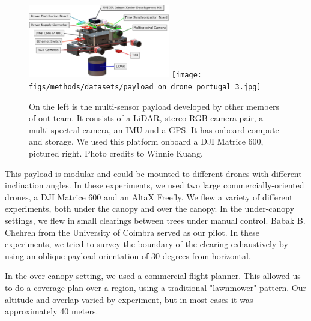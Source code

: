 \begin{figure}
    \centering
    \includegraphics[width=0.55\textwidth]{figs/methods/datasets/payload_annotated.pdf}
    \hfill
    \texttt{[image: figs/methods/datasets/payload\_on\_drone\_portugal\_3.jpg]}
    \caption{On the left is the multi-sensor payload developed by other members of out team. It consists of a LiDAR, stereo RGB camera pair, a multi spectral camera, an IMU and a GPS. It has onboard compute and storage. We used this platform onboard a DJI Matrice 600, pictured right. Photo credits to Winnie Kuang.}
    \label{fig:methods:payload}
\end{figure}

This payload is modular and could be mounted to different drones with different inclination angles. In these experiments, we used two large commercially-oriented drones, a DJI Matrice 600 and an AltaX Freefly. We flew a variety of different experiments, both under the canopy and over the canopy. In the under-canopy settings, we flew in small clearings between trees under manual control. Babak B. Chehreh from the University of Coimbra served as our pilot. In these experiments, we tried to survey the boundary of the clearing exhaustively by using an oblique payload orientation of 30 degrees from horizontal.

In the over canopy setting, we used a commercial flight planner. This allowed us to do a coverage plan over a region, using a traditional "lawnmower" pattern. Our altitude and overlap varied by experiment, but in most cases it was approximately 40 meters.


